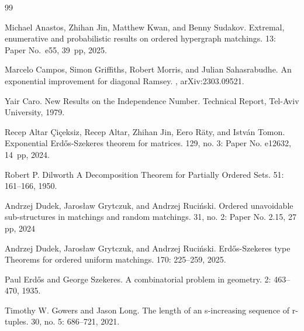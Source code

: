 \begin{thebibliography}{99}



Michael Anastos, Zhihan Jin, Matthew Kwan, and Benny Sudakov.
\newblock Extremal, enumerative and probabilistic results on ordered hypergraph matchings.
 13: Paper No.~e55, 39~pp, 2025.

Marcelo Campos, Simon Griffiths, Robert Morris, and Julian Sahasrabudhe. 
\newblock An exponential improvement for diagonal Ramsey.
, arXiv:2303.09521.

Yair Caro. 
\newblock New Results on the Independence Number.
\newblock Technical Report, Tel-Aviv University, 1979.

Recep Altar Çiçeksiz, Recep Altar, Zhihan Jin, Eero Räty, and István Tomon. 
\newblock Exponential Erd\H{o}s-Szekeres theorem for matrices.
 129, no. 3: Paper No. e12632, 14~pp, 2024.

Robert P. Dilworth 
\newblock A Decomposition Theorem for Partially Ordered Sets.
  51: 161--166, 1950.

Andrzej Dudek, Jarosław Grytczuk, and Andrzej Ruci\'{n}ski. 
\newblock Ordered unavoidable sub-structures in matchings and random matchings.
 31, no. 2: Paper No. 2.15, 27 pp, 2024

Andrzej Dudek, Jarosław Grytczuk, and Andrzej Ruci\'{n}ski. 
\newblock Erd\H{o}s-Szekeres type Theorems for ordered uniform matchings.
 170: 225--259, 2025.

Paul Erd{\H o}s and George Szekeres. 
\newblock A combinatorial problem in geometry.
 2: 463--470, 1935.

 Timothy W. Gowers and Jason Long.
\newblock The length of an s-increasing sequence of r-tuples.  30, no. 5: 686--721, 2021.


\end{thebibliography}
